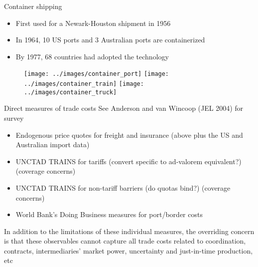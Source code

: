 \documentclass[10pt,notes=hide]{beamer}
\begin{document}
\begin{frame}{Container shipping}
\begin{itemize}
	\item First used for a Newark-Houston shipment in 1956 %
	\item In 1964, 10 US ports and 3 Australian ports are containerized %
	\item By 1977, 68 countries had adopted the technology
\end{itemize}
\begin{center}\begin{figure}
	\texttt{[image: ../images/container\_port]} \hfill
	\texttt{[image: ../images/container\_train]} \hfill
	\texttt{[image: ../images/container\_truck]}
\end{figure}  \end{center}
\end{frame}
\begin{frame}{Direct measures of trade costs}
See Anderson and van Wincoop (JEL 2004) for survey
\begin{itemize}
	\item Endogenous price quotes for freight and insurance (above plus the US and Australian import data)
	\item UNCTAD TRAINS for tariffs (convert specific to ad-valorem equivalent?) (coverage concerns)
	\item UNCTAD TRAINS for non-tariff barriers (do quotas bind?) (coverage concerns)
	\item World Bank's Doing Business measures for port/border costs
\end{itemize}
In addition to the limitations of these individual measures,
the overriding concern is that these observables cannot capture all trade costs related to coordination, contracts, intermediaries' market power, uncertainty and just-in-time production, etc
\end{frame}
\end{document}
